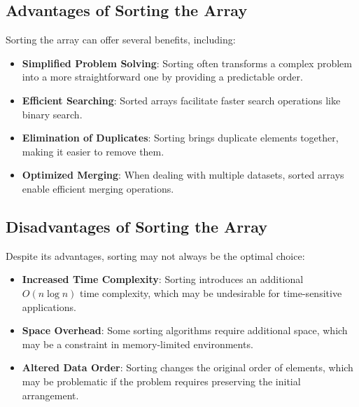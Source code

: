 \subsection*{Advantages of Sorting the Array}
Sorting the array can offer several benefits, including:

\begin{itemize}
    \item \textbf{Simplified Problem Solving}: Sorting often transforms a complex problem into a more straightforward one by providing a predictable order.
    
    \item \textbf{Efficient Searching}: Sorted arrays facilitate faster search operations like binary search.
    
    \item \textbf{Elimination of Duplicates}: Sorting brings duplicate elements together, making it easier to remove them.
    
    \item \textbf{Optimized Merging}: When dealing with multiple datasets, sorted arrays enable efficient merging operations.
\end{itemize}

\subsection*{Disadvantages of Sorting the Array}
Despite its advantages, sorting may not always be the optimal choice:

\begin{itemize}
    \item \textbf{Increased Time Complexity}: Sorting introduces an additional \( O(n \log n) \) time complexity, which may be undesirable for time-sensitive applications.
    
    \item \textbf{Space Overhead}: Some sorting algorithms require additional space, which may be a constraint in memory-limited environments.
    
    \item \textbf{Altered Data Order}: Sorting changes the original order of elements, which may be problematic if the problem requires preserving the initial arrangement.
\end{itemize}

